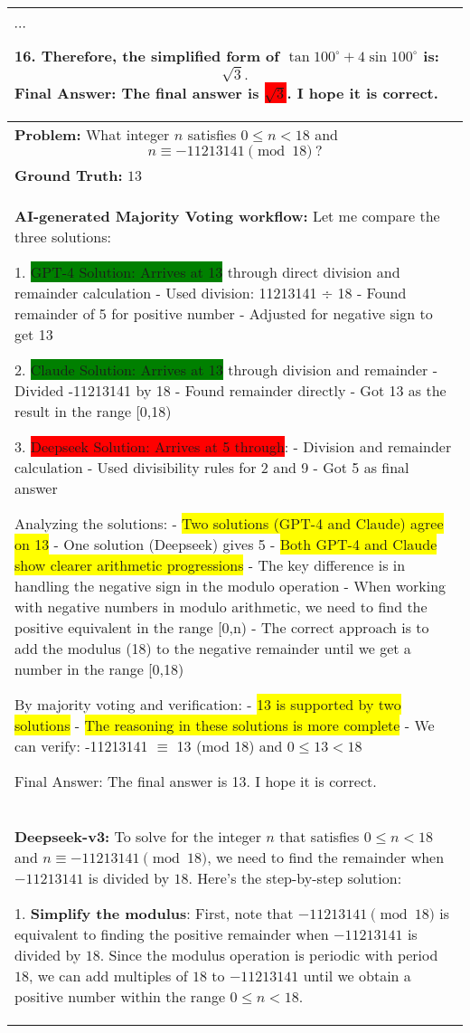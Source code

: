 \begin{longtable}{p{15cm}}
$\cdots$

16. Therefore, the simplified form of \(\tan 100^\circ + 4 \sin 100^\circ\) is:
    \[
    \boxed{\sqrt{3}}.
    \]
Final Answer: The final answer is \colorbox{red}{\(\sqrt{3}\)}. I hope it is correct. \\
\midrule
\midrule
\textbf{Problem:} What integer $n$ satisfies $0\le n<18$ and $$n\equiv -11213141\pmod{18}~?$$ \\
\midrule
\textbf{Ground Truth:} $13$ \\
\midrule
\textbf{AI-generated Majority Voting workflow:} Let me compare the three solutions:

1. \colorbox{green}{GPT-4 Solution: Arrives at 13} through direct division and remainder calculation
- Used division: 11213141 ÷ 18
- Found remainder of 5 for positive number
- Adjusted for negative sign to get 13

2. \colorbox{green}{Claude Solution: Arrives at 13} through division and remainder
- Divided -11213141 by 18
- Found remainder directly
- Got 13 as the result in the range [0,18)

3. \colorbox{red}{Deepseek Solution: Arrives at 5 through}:
- Division and remainder calculation
- Used divisibility rules for 2 and 9
- Got 5 as final answer

Analyzing the solutions:
- \colorbox{yellow}{Two solutions (GPT-4 and Claude) agree on 13}
- One solution (Deepseek) gives 5
- \colorbox{yellow}{Both GPT-4 and Claude show clearer arithmetic progressions}
- The key difference is in handling the negative sign in the modulo operation
- When working with negative numbers in modulo arithmetic, we need to find the positive equivalent in the range [0,n)
- The correct approach is to add the modulus (18) to the negative remainder until we get a number in the range [0,18)

By majority voting and verification:
- \colorbox{yellow}{13 is supported by two solutions}
- \colorbox{yellow}{The reasoning in these solutions is more complete}
- We can verify: -11213141 $\equiv$ 13 (mod 18) and $0 \leq 13 < 18$

Final Answer: The final answer is 13. I hope it is correct. \\
\midrule
\textbf{Deepseek-v3:} To solve for the integer \( n \) that satisfies \( 0 \leq n < 18 \) and \( n \equiv -11213141 \pmod{18} \), we need to find the remainder when \(-11213141\) is divided by \(18\). Here's the step-by-step solution:

1. \textbf{Simplify the modulus}: First, note that \(-11213141 \pmod{18}\) is equivalent to finding the positive remainder when \(-11213141\) is divided by \(18\). Since the modulus operation is periodic with period \(18\), we can add multiples of \(18\) to \(-11213141\) until we obtain a positive number within the range \(0 \leq n < 18\).


\end{longtable}
